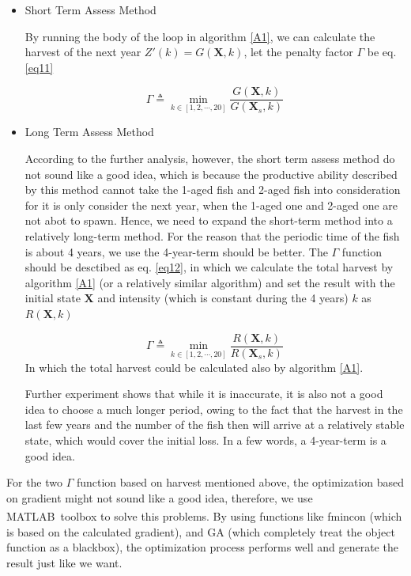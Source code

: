 \documentclass{IEEEtran}
\begin{document}
\begin{itemize}
    \item {Short Term Assess Method

    By running the body of the loop in algorithm \ref{A1}, we can calculate the harvest of the next year $Z'(k) = G(\bm X,k)$, let the penalty factor $\Gamma$ be eq. \ref{eq11}
    
    \begin{equation}
        \label{eq11}
        \Gamma \triangleq \min_{k \in[1,2,\cdots,20]} \frac{G(\bm X,k)}{G(\bm X_s,k)}
    \end{equation}
    }

    \item {Long Term Assess Method
        
    According to the further analysis, however, the short term assess method do not sound like a good idea, which is because the productive ability described by this method cannot take the 1-aged fish and 2-aged fish into consideration for it is only consider the next year, when the 1-aged one and 2-aged one are not abot to spawn. Hence, we need to expand the short-term method into a relatively long-term method. For the reason that the periodic time of the fish is about 4 years, we use the 4-year-term should be better. The $\Gamma$ function should be desctibed as eq. \ref{eq12}, in which we calculate the total harvest by algorithm \ref{A1} (or a relatively similar algorithm) and set the result with the initial state $\bm X$ and intensity (which is constant during the 4 years) $k$ as $R(\bm X,k)$
    
    \begin{equation}
        \label{eq12}
        \Gamma \triangleq \min_{k \in[1,2,\cdots,20]} \frac{R(\bm X,k)}{R(\bm X_s,k)}
    \end{equation}
    In which the total harvest could be calculated also by algorithm \ref{A1}.

    Further experiment shows that while it is inaccurate, it is also not a good idea to choose a much longer period, owing to the fact that the harvest in the last few years and the number of the fish then will arrive at a relatively stable state, which would cover the initial loss. In a few words, a 4-year-term is a good idea.
        }
\end{itemize}

For the two $\Gamma$ function based on harvest mentioned above, the optimization based on gradient might not sound like a good idea, therefore, we use MATLAB\textsuperscript\textregistered \ toolbox to solve this problems. By using functions like fmincon (which is based on the calculated gradient), and GA (which completely treat the object function as a blackbox), the optimization process performs well and generate the result just like we want.
\end{document}
